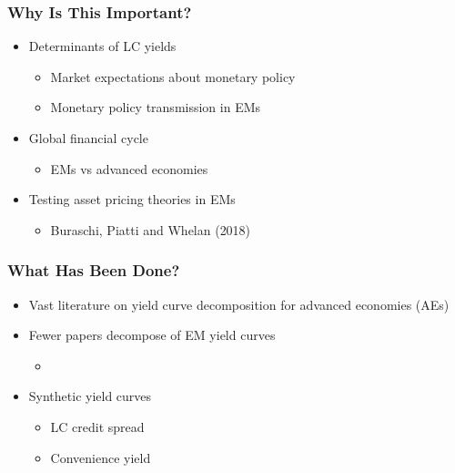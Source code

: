 \documentclass[12pt, aspectratio=169, xcolor=dvipsnames]{beamer} 			         %
\begin{document}
\begin{frame}
	\frametitle{Why Is This Important?}
	\begin{itemize}
		\item Determinants of LC yields
		\begin{itemize}
			\item Market expectations about monetary policy
			\item Monetary policy transmission in EMs
		\end{itemize}
		\item<2-> Global financial cycle
		\begin{itemize}
			\item<2-> EMs vs advanced economies
		\end{itemize}
		\item<3> Testing asset pricing theories in EMs
		\begin{itemize}
			\item<3> Buraschi, Piatti and Whelan (2018)
		\end{itemize}
	\end{itemize}
\end{frame}

\begin{frame}
	\frametitle{What Has Been Done?}
	\begin{itemize}
		\item Vast literature on yield curve decomposition for advanced economies (AEs)
		\item Fewer papers decompose of EM yield curves
		\begin{itemize}
			\item \citet*{BlakeRuleRummel:2015}
		\end{itemize}
		\item<2-> Synthetic yield curves
		\begin{itemize}
			\item<2-> LC credit spread \citep{DuSchreger:2016a}
			\item<2-> Convenience yield \citep*{DuImSchreger:2018}
		\end{itemize}
	\end{itemize}
\end{frame}
\end{document}

